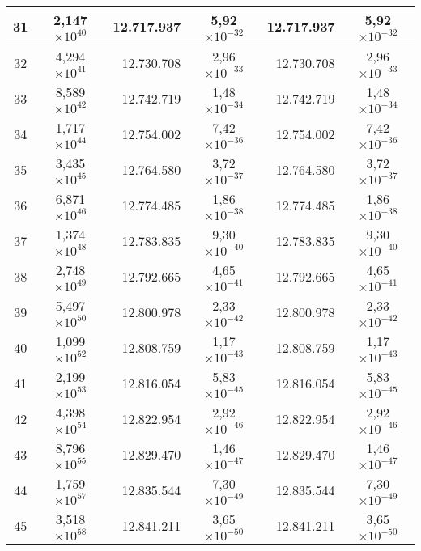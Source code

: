 \begin{table}[!hbt]
\begin{tabular}{| c  r  r  c  r  c |}
    31 & \multicolumn{1}{c}{2,147$\times 10^{40}$} & 12.717.937  & 5,92$\times 10^{-32}$ & 12.717.937  & 5,92$\times 10^{-32}$ \\ \hline
    32 & \multicolumn{1}{c}{4,294$\times 10^{41}$} & 12.730.708  & 2,96$\times 10^{-33}$ & 12.730.708  & 2,96$\times 10^{-33}$ \\ \hline  
    33 & \multicolumn{1}{c}{8,589$\times 10^{42}$} & 12.742.719  & 1,48$\times 10^{-34}$ & 12.742.719  & 1,48$\times 10^{-34}$ \\ \hline
    34 & \multicolumn{1}{c}{1,717$\times 10^{44}$} & 12.754.002  & 7,42$\times 10^{-36}$ & 12.754.002  & 7,42$\times 10^{-36}$ \\ \hline  
    35 & \multicolumn{1}{c}{3,435$\times 10^{45}$} & 12.764.580  & 3,72$\times 10^{-37}$ & 12.764.580  & 3,72$\times 10^{-37}$ \\ \hline
    36 & \multicolumn{1}{c}{6,871$\times 10^{46}$} & 12.774.485  & 1,86$\times 10^{-38}$ & 12.774.485  & 1,86$\times 10^{-38}$ \\ \hline  
    37 & \multicolumn{1}{c}{1,374$\times 10^{48}$} & 12.783.835  & 9,30$\times 10^{-40}$ & 12.783.835  & 9,30$\times 10^{-40}$ \\ \hline
    38 & \multicolumn{1}{c}{2,748$\times 10^{49}$} & 12.792.665  & 4,65$\times 10^{-41}$ & 12.792.665  & 4,65$\times 10^{-41}$ \\ \hline  
    39 & \multicolumn{1}{c}{5,497$\times 10^{50}$} & 12.800.978  & 2,33$\times 10^{-42}$ & 12.800.978  & 2,33$\times 10^{-42}$ \\ \hline
    40 & \multicolumn{1}{c}{1,099$\times 10^{52}$} & 12.808.759  & 1,17$\times 10^{-43}$ & 12.808.759  & 1,17$\times 10^{-43}$ \\ \hline  
    41 & \multicolumn{1}{c}{2,199$\times 10^{53}$} & 12.816.054  & 5,83$\times 10^{-45}$ & 12.816.054  & 5,83$\times 10^{-45}$ \\ \hline
    42 & \multicolumn{1}{c}{4,398$\times 10^{54}$} & 12.822.954  & 2,92$\times 10^{-46}$ & 12.822.954  & 2,92$\times 10^{-46}$ \\ \hline  
    43 & \multicolumn{1}{c}{8,796$\times 10^{55}$} & 12.829.470  & 1,46$\times 10^{-47}$ & 12.829.470  & 1,46$\times 10^{-47}$ \\ \hline
    44 & \multicolumn{1}{c}{1,759$\times 10^{57}$} & 12.835.544  & 7,30$\times 10^{-49}$ & 12.835.544  & 7,30$\times 10^{-49}$ \\ \hline  
    45 & \multicolumn{1}{c}{3,518$\times 10^{58}$} & 12.841.211  & 3,65$\times 10^{-50}$ & 12.841.211  & 3,65$\times 10^{-50}$ \\ \hline

\end{tabular}
\end{table}
